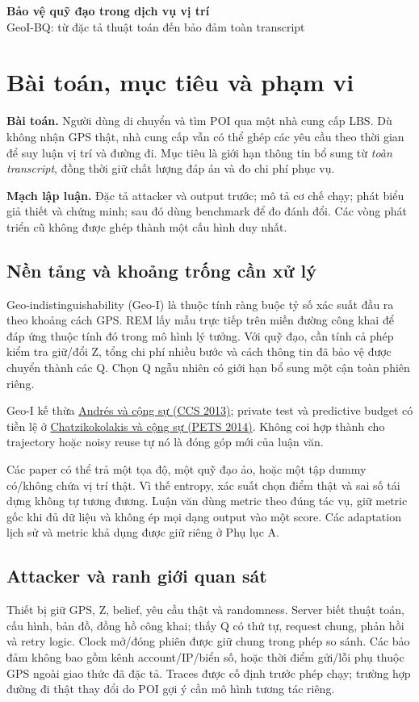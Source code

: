 \documentclass[10pt,a4paper]{article}
\begin{document}
\begin{center}
{\LARGE\bfseries\color{ink}Bảo vệ quỹ đạo trong dịch vụ vị trí}\\[3pt]
{\large GeoI-BQ: từ đặc tả thuật toán đến bảo đảm toàn transcript}
\end{center}

\section{Bài toán, mục tiêu và phạm vi}
\textbf{Bài toán.} Người dùng di chuyển và tìm POI qua một nhà cung cấp LBS. Dù không nhận GPS thật,
nhà cung cấp vẫn có thể ghép các yêu cầu theo thời gian để suy luận vị trí và đường đi.
Mục tiêu là giới hạn thông tin bổ sung từ \emph{toàn transcript}, đồng thời giữ chất lượng đáp án và đo chi phí phục vụ.

\textbf{Mạch lập luận.} Đặc tả attacker và output trước; mô tả cơ chế chạy; phát biểu giả thiết và chứng minh;
sau đó dùng benchmark để đo đánh đổi. Các vòng phát triển cũ không được ghép thành một cấu hình duy nhất.

\subsection{Nền tảng và khoảng trống cần xử lý}
Geo-indistinguishability (Geo-I) là thuộc tính ràng buộc tỷ số xác suất đầu ra theo khoảng cách GPS.
REM lấy mẫu trực tiếp trên miền đường công khai để đáp ứng thuộc tính đó trong mô hình lý tưởng.
Với quỹ đạo, cần tính cả phép kiểm tra giữ/đổi Z, tổng chi phí nhiều bước và cách thông tin đã bảo vệ
được chuyển thành các Q. Chọn Q ngẫu nhiên có giới hạn bổ sung một cận toàn phiên riêng.

Geo-I kế thừa \href{https://arxiv.org/abs/1212.1984}{Andrés và cộng sự (CCS 2013)};
private test và predictive budget có tiền lệ ở
\href{https://petsymposium.org/2014/papers/Chatzikokolakis.pdf}{Chatzikokolakis và cộng sự (PETS 2014)}.
Không coi hợp thành cho trajectory hoặc noisy reuse tự nó là đóng góp mới của luận văn.

Các paper có thể trả một tọa độ, một quỹ đạo ảo, hoặc một tập dummy có/không chứa vị trí thật.
Vì thế entropy, xác suất chọn điểm thật và sai số tái dựng không tự tương đương. Luận văn dùng metric
theo đúng tác vụ, giữ metric gốc khi đủ dữ liệu và không ép mọi dạng output vào một score.
Các adaptation lịch sử và metric khả dụng được giữ riêng ở Phụ lục A.

\subsection{Attacker và ranh giới quan sát}
Thiết bị giữ GPS, Z, belief, yêu cầu thật và randomness. Server biết thuật toán, cấu hình, bản đồ,
đồng hồ công khai; thấy Q có thứ tự, request chung, phản hồi và retry logic.
Clock mở/đóng phiên được giữ chung trong phép so sánh. Các bảo đảm không bao gồm kênh account/IP/biển số,
hoặc thời điểm gửi/lỗi phụ thuộc GPS ngoài giao thức đã đặc tả.
Traces được cố định trước phép chạy; trường hợp đường đi thật thay đổi do POI gợi ý cần mô hình tương tác riêng.
\end{document}
